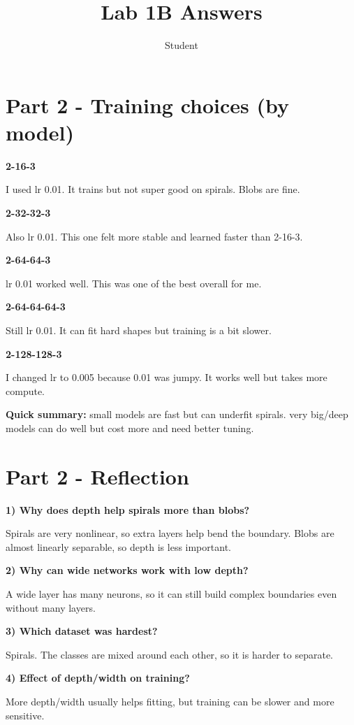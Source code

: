 \documentclass{article}
\title{Lab 1B Answers}
\author{Student}
\date{}
\begin{document}
\maketitle

\section*{Part 2 - Training choices (by model)}

\textbf{2-16-3}

I used lr 0.01. It trains but not super good on spirals. Blobs are fine. 

\textbf{2-32-32-3}

Also lr 0.01. This one felt more stable and learned faster than 2-16-3.

\textbf{2-64-64-3}

lr 0.01 worked well. This was one of the best overall for me.

\textbf{2-64-64-64-3}

Still lr 0.01. It can fit hard shapes but training is a bit slower.

\textbf{2-128-128-3}

I changed lr to 0.005 because 0.01 was jumpy. It works well but takes more compute.

\textbf{Quick summary:}
small models are fast but can underfit spirals. very big/deep models can do well but cost more and need better tuning.

\section*{Part 2 - Reflection}

\textbf{1) Why does depth help spirals more than blobs?}

Spirals are very nonlinear, so extra layers help bend the boundary. Blobs are almost linearly separable, so depth is less important.

\textbf{2) Why can wide networks work with low depth?}

A wide layer has many neurons, so it can still build complex boundaries even without many layers.

\textbf{3) Which dataset was hardest?}

Spirals. The classes are mixed around each other, so it is harder to separate.

\textbf{4) Effect of depth/width on training?}

More depth/width usually helps fitting, but training can be slower and more sensitive.
\end{document}
